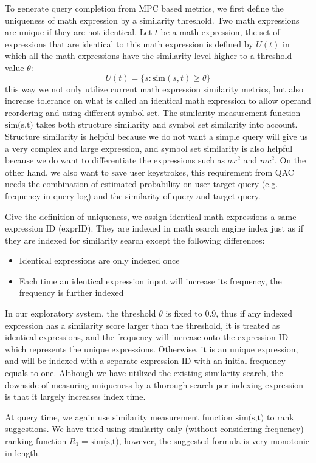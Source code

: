 \documentclass[12pt]{article} %
\begin{document}
To generate query completion from MPC based metrics, we first define the uniqueness of math expression by a similarity threshold.
Two math expressions are unique if they are not identical.
Let $t$ be a math expression, the set of expressions that are identical to this math expression is defined by $U(t)$ in which all the math expressions have the similarity level higher to a threshold value $\theta$:
$$
U(t) = \{s: \text{sim}(s, t) \ge \theta\}
$$
this way we not only utilize current math expression similarity metrics,
but also increase tolerance on what is called an identical math expression to allow operand reordering and using different symbol set.
The similarity measurement function $\text{sim(s,t)}$ takes both structure similarity and symbol set similarity into account.
Structure similarity is helpful because we do not want a simple query will give us a very complex and large expression, and symbol set similarity is also helpful because we do want to differentiate the expressions such as $ax^2$ and $mc^2$.
On the other hand, we also want to save user keystrokes, this requirement from QAC needs the combination of estimated probability on user target query (e.g. frequency in query log) and the similarity of query and target query.

Give the definition of uniqueness, we assign identical math expressions a same expression ID (exprID). They are indexed in math search engine index just as if they are indexed for similarity search except the following differences:
\begin{itemize}
\item Identical expressions are only indexed once
\item Each time an identical expression input will increase its frequency, the frequency is further
indexed
\end{itemize}

In our exploratory system, the threshold $\theta$ is fixed to 0.9,
thus if any indexed expression has a similarity score larger than
the threshold, it is treated as identical expressions, and the frequency will
increase onto the expression ID which represents the unique expressions.
Otherwise, it is an unique expression, and will be indexed with a separate
expression ID with an initial frequency equals to one.
Although we have utilized the existing similarity search, the
downside of measuring uniqueness by a thorough search per indexing
expression is that it largely increases index time.

At query time, we again use similarity measurement function $\text{sim(s,t)}$ 
to rank suggestions.
We have tried using similarity only (without considering frequency) ranking function $R_1 = \text{sim(s,t)}$, however, the suggested formula is very monotonic in length.
\end{document}
